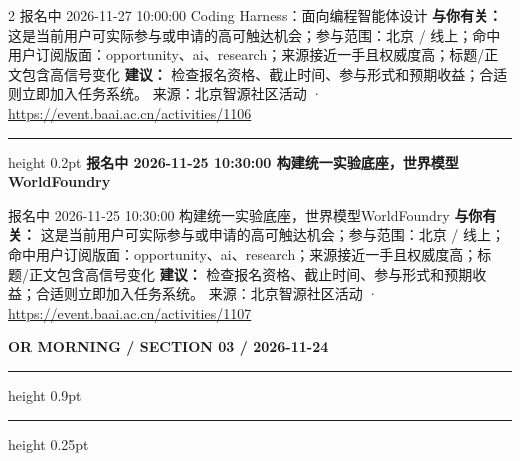 \documentclass[10.5pt]{ctexart}
\begin{document}
\begin{multicols}{2}
报名中 2026-11-27 10:00:00 Coding Harness：面向编程智能体设计
\textbf{与你有关：} 这是当前用户可实际参与或申请的高可触达机会；参与范围：北京 / 线上；命中用户订阅版面：opportunity、ai、research；来源接近一手且权威度高；标题/正文包含高信号变化
\textbf{建议：} 检查报名资格、截止时间、参与形式和预期收益；合适则立即加入任务系统。
{\footnotesize\color{ormuted} 来源：北京智源社区活动 · \url{https://event.baai.ac.cn/activities/1106}}
\vspace{2mm}
\hrule height 0.2pt
\vspace{2mm}
{\large\bfseries 报名中 2026-11-25 10:30:00 构建统一实验底座，世界模型WorldFoundry}\par
报名中 2026-11-25 10:30:00 构建统一实验底座，世界模型WorldFoundry
\textbf{与你有关：} 这是当前用户可实际参与或申请的高可触达机会；参与范围：北京 / 线上；命中用户订阅版面：opportunity、ai、research；来源接近一手且权威度高；标题/正文包含高信号变化
\textbf{建议：} 检查报名资格、截止时间、参与形式和预期收益；合适则立即加入任务系统。
{\footnotesize\color{ormuted} 来源：北京智源社区活动 · \url{https://event.baai.ac.cn/activities/1107}}
\end{multicols}
\newpage
{\small\bfseries OR MORNING / SECTION 03 / 2026-11-24}
\vspace{2mm}
\hrule height 0.9pt
\vspace{1.5mm}
\hrule height 0.25pt
\vspace{4mm}
\end{document}
